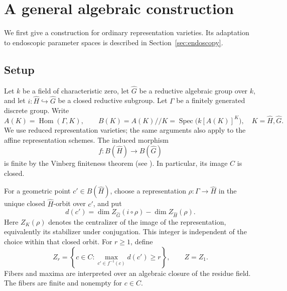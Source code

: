 \documentclass[11pt,a4paper]{amsart}
\DeclareMathOperator{\Hom}{Hom}
\DeclareMathOperator{\Spec}{Spec}
\newcommand{\sms}{\smallskip}
\theoremstyle{definition}
\theoremstyle{remark}
\begin{document}
\section{A general algebraic construction}\label{sec:algebraic}
We first give a construction for ordinary representation varieties. Its adaptation to endoscopic parameter spaces is described in Section~\ref{sec:endoscopy}.

\sms

\subsection{Setup}
Let $k$ be a field of characteristic zero, let $\hat G$ be a reductive algebraic
group over $k$, and let $i: \hat H\hookrightarrow \hat G$ be a closed reductive subgroup.
Let $\Gamma$ be a finitely generated discrete group. Write
$$
 A(K)=\Hom(\Gamma,K),\qquad
 B(K)=A(K)//K=\Spec\bigl(k[A(K)]^K\bigr),\quad K= \hat H, \hat G.
$$
We use reduced representation varieties; the same arguments also apply to
the affine representation schemes. The induced morphism
$$
 f:B(\hat H)\longrightarrow B(\hat G)
$$
is finite by the Vinberg finiteness theorem (see \cite[Theorem 1.1]{Cotner}).
In particular, its image $C$ is closed.

For a geometric point $c'\in B(\hat H)$, choose a representation
$\rho:\Gamma\to \hat H$ in the unique closed $\hat H$-orbit over $c'$, and put
$$
 d(c')=\dim Z_{\hat G}(i\circ\rho)-\dim Z_{ \hat H}(\rho).
$$
Here $Z_K(\rho)$ denotes the centralizer of the image of the representation,
equivalently its stabilizer under conjugation. This integer is independent
of the choice within that closed orbit. For $r\geq1$, define
$$
 Z_r=\left\{c\in C:\max_{c'\in f^{-1}(c)}d(c')\geq r\right\},
 \qquad Z=Z_1.
$$
Fibers and maxima are interpreted over an algebraic closure of the residue
field. The fibers are finite and nonempty for $c\in C$.
\end{document}
